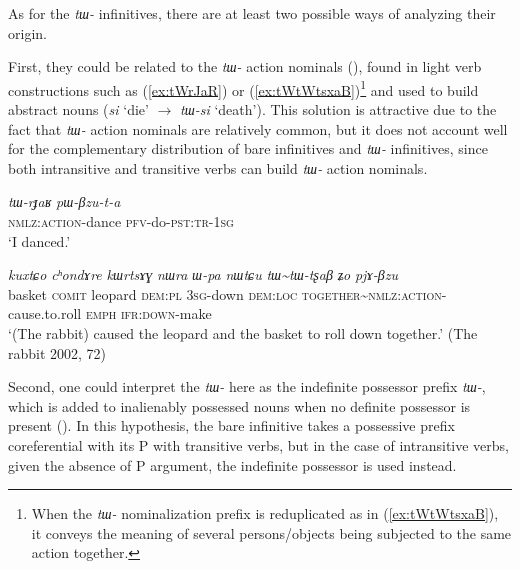 \documentclass[oneside,a4paper,11pt]{article}
\newcommand{\ipa}[1]{\textit{\phon#1}}
\newcommand{\tld}{\textasciitilde{}}
\begin{document}
As for the \ipa{tɯ-} infinitives, there  are at least two possible ways of analyzing their origin.


First, they could be related to the \ipa{tɯ-} action nominals (\citealt{jacques14antipassive}), found in light verb constructions such as (\ref{ex:tWrJaR}) or (\ref{ex:tWtWtsxaB})\footnote{When the \ipa{tɯ-} nominalization prefix is reduplicated as in (\ref{ex:tWtWtsxaB}), it conveys the meaning of several persons/objects being subjected to the same action together. } and used to build abstract nouns (\ipa{si} `die' $\rightarrow$ \ipa{tɯ-si} `death'). This solution is attractive due to the fact that \ipa{tɯ-} action nominals are relatively common, but it does not account well for the complementary distribution of bare infinitives and \ipa{tɯ-} infinitives, since both intransitive and transitive verbs can build \ipa{tɯ-} action nominals.

\begin{exe}
\ex \label{ex:tWrJaR}
\gll \ipa{tɯ-rɟaʁ} \ipa{pɯ-βzu-t-a} \\
\textsc{nmlz:action}-dance \textsc{pfv}-do-\textsc{pst:tr-1sg} \\
\glt `I danced.'
\end{exe}

\begin{exe}
\ex \label{ex:tWtWtsxaB}
\gll
\ipa{kuxtɕo} 	\ipa{cʰondɤre}  	\ipa{kɯrtsɤɣ} 	\ipa{nɯra} 	\ipa{ɯ-pa} 	\ipa{nɯtɕu} 	\ipa{tɯ\tld{}tɯ-tʂaβ} 	\ipa{ʑo} 	\ipa{pjɤ-βzu} \\
basket \textsc{comit} leopard \textsc{dem:pl} \textsc{3sg}-down \textsc{dem:loc} \textsc{together}\tld{}\textsc{nmlz:action}-cause.to.roll \textsc{emph} \textsc{ifr:down}-make \\
\glt `(The rabbit) caused the leopard and the basket to roll down together.' (The rabbit 2002, 72)
\end{exe}

Second, one could interpret the \ipa{tɯ-} here as the indefinite possessor prefix \ipa{tɯ-}, which is added to inalienably possessed nouns when no definite possessor is present (\citealt{jacques17generic}). In this hypothesis, the bare infinitive takes a possessive prefix coreferential with its P with transitive verbs, but in the case of intransitive verbs, given the absence of P argument, the indefinite possessor is used instead.
\end{document}
